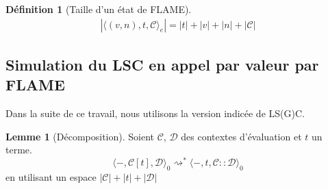\documentclass[11pt,a4paper]{article}
\theoremstyle{definition}
\newtheorem{definition}{Définition}[section]
\newtheorem{lemma}[theorem]{Lemme}
\newcommand{\etat}[1]{\langle #1 \rangle}
\newcommand{\mcd}{\mathcal{D}}
\newcommand{\mcc}{\mathcal{C}}
\begin{document}
\begin{definition}[Taille d'un état de FLAME]
\begin{align*}
    |\etat{(v,n), t, \mcc}_e| = |t| + |v| + |n| + |\mcc|
\end{align*}  
\end{definition}


\subsection{Simulation du LSC en appel par valeur par FLAME}
Dans la suite de ce travail, nous utilisons la version indicée de LS(G)C.
\begin{lemma}[Décomposition]
  \label{lemmaplouf}
  Soient $\mathcal{C}$, $\mathcal{D}$ des contextes d'évaluation et $t$ un terme.
\[\langle -,\mathcal{C}[t], \mathcal{D}\rangle_0 \rightsquigarrow^* \langle -,t,\mathcal{C} :: \mathcal{D}\rangle_0\]
en utilisant un espace $|\mcc|+|t|+|\mcd|$
\end{lemma}
\end{document}
